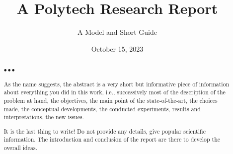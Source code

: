 \documentclass[11pt, english, screen, research-development]{report-rd-info}
\newenvironment{explanation}
{\color{blue}
 \begin{list}{}{\hspace{0.2\textwidth}\color{blue}}\item $\bullet\bullet\bullet$
}
{\end{list}}
\begin{document}
\title{A Polytech Research Report}
\subtitle{A Model and Short Guide}

\date{October 15, 2023}


\begin{abstract}
\small

\begin{explanation}
   As the name suggests, the abstract is a very short but informative piece of information about everything you did in this work, i.e., successively most of the description of the problem at hand, the objectives, the main point of the state-of-the-art, the choices made, the conceptual developments, the conducted experiments, results and interpretations, the new issues.

   It is the last thing to write!
   Do not provide any details, give popular scientific information.
   The introduction and conclusion of the report are there to develop the overall ideas.
\end{explanation}
\end{abstract}
\end{document}

